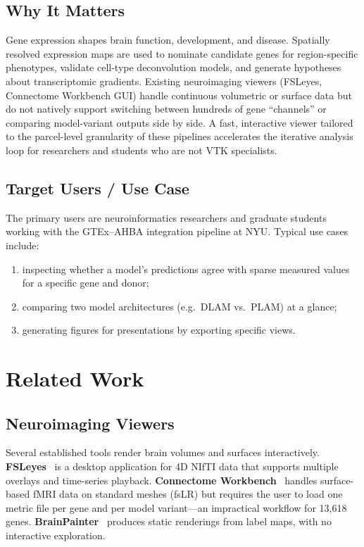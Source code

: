 \documentclass[11pt,letterpaper]{article}
\begin{document}
\subsection{Why It Matters}

Gene expression shapes brain function, development, and disease.
Spatially resolved expression maps are used to nominate candidate genes for
region-specific phenotypes, validate cell-type deconvolution models, and
generate hypotheses about transcriptomic gradients.
Existing neuroimaging viewers (FSLeyes, Connectome Workbench GUI) handle
continuous volumetric or surface data but do not natively support
switching between hundreds of gene ``channels'' or comparing model-variant
outputs side by side.
A fast, interactive viewer tailored to the parcel-level granularity of these
pipelines accelerates the iterative analysis loop for researchers and students
who are not VTK specialists.

\subsection{Target Users / Use Case}

The primary users are neuroinformatics researchers and graduate students working
with the GTEx--AHBA integration pipeline at NYU.
Typical use cases include:
\begin{enumerate}[nosep]
  \item inspecting whether a model's predictions agree with sparse measured values
        for a specific gene and donor;
  \item comparing two model architectures (e.g.\ DLAM vs.\ PLAM) at a glance;
  \item generating figures for presentations by exporting specific views.
\end{enumerate}

\section{Related Work}
\label{sec:related}

\subsection{Neuroimaging Viewers}

Several established tools render brain volumes and surfaces interactively.
\textbf{FSLeyes}~\citep{mccarthy2021} is a desktop application for 4D
NIfTI data that supports multiple overlays and time-series playback.
\textbf{Connectome Workbench}~\citep{marcus2011} handles surface-based
fMRI data on standard meshes (fsLR) but requires the user to load one
metric file per gene and per model variant—an impractical workflow for
13{,}618 genes.
\textbf{BrainPainter}~\citep{marinescu2019} produces static renderings from
label maps, with no interactive exploration.
\end{document}
